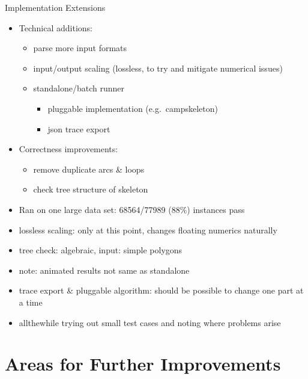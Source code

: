\documentclass[
  size=9pt,
  style=klope,
  paper=screen,
  mode=print,
  display=slides,
  nohandoutpagebreaks,
  pauseslide,
  hlsections,
  fleqn,
  dvips,
  clock
]{powerdot}
\begin{document}
\begin{slide}{Implementation Extensions}
  \begin{itemize}
    \item Technical additions:
    \begin{itemize}
      \item parse more input formats
      \item input/output scaling (lossless, to try and mitigate numerical issues)
      \item standalone/batch runner
      \begin{itemize}
        \item pluggable implementation (e.g.\ campskeleton)
        \item json trace export
      \end{itemize}
    \end{itemize}

    \item Correctness improvements:
    \begin{itemize}
      \item remove duplicate arcs \& loops
      \item check tree structure of skeleton
    \end{itemize}

    \item Ran on one large data set: 68564/77989 ($88\%$) instances pass
  \end{itemize}
\end{slide}
\begin{note}{}
  \begin{itemize}
    \item lossless scaling: only at this point, changes floating numerics naturally
    \item tree check: algebraic, input: simple polygons
    \item note: animated results not same as standalone
    \item trace export \& pluggable algorithm: should be possible to change one part at a time
    \item allthewhile trying out small test cases and noting where problems arise
  \end{itemize}
\end{note}

\section[template=wideslide]{Areas for Further Improvements}
\end{document}
